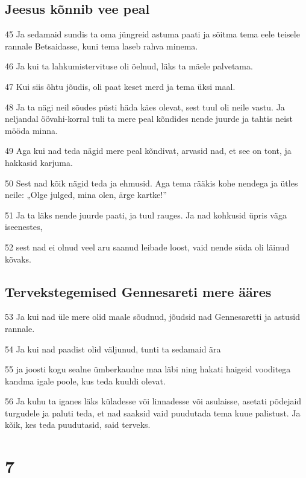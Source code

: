 \section*{Jeesus kõnnib vee peal}

\par 45 Ja sedamaid sundis ta oma jüngreid astuma paati ja sõitma tema eele teisele rannale Betsaidasse, kuni tema laseb rahva minema.
\par 46 Ja kui ta lahkumistervituse oli öelnud, läks ta mäele palvetama.
\par 47 Kui siis õhtu jõudis, oli paat keset merd ja tema üksi maal.
\par 48 Ja ta nägi neil sõudes püsti häda käes olevat, sest tuul oli neile vastu. Ja neljandal öövahi-korral tuli ta mere peal kõndides nende juurde ja tahtis neist mööda minna.
\par 49 Aga kui nad teda nägid mere peal kõndivat, arvasid nad, et see on tont, ja hakkasid karjuma.
\par 50 Sest nad kõik nägid teda ja ehmusid. Aga tema rääkis kohe nendega ja ütles neile: „Olge julged, mina olen, ärge kartke!”
\par 51 Ja ta läks nende juurde paati, ja tuul rauges. Ja nad kohkusid üpris väga iseenestes,
\par 52 sest nad ei olnud veel aru saanud leibade loost, vaid nende süda oli läinud kõvaks.

\section*{Tervekstegemised Gennesareti mere ääres}

\par 53 Ja kui nad üle mere olid maale sõudnud, jõudsid nad Gennesaretti ja astusid rannale.
\par 54 Ja kui nad paadist olid väljunud, tunti ta sedamaid ära
\par 55 ja joosti kogu sealne ümberkaudne maa läbi ning hakati haigeid vooditega kandma igale poole, kus teda kuuldi olevat.
\par 56 Ja kuhu ta iganes läks küladesse või linnadesse või asulaisse, asetati põdejaid turgudele ja paluti teda, et nad saaksid vaid puudutada tema kuue palistust. Ja kõik, kes teda puudutasid, said terveks.


\chapter{7}

